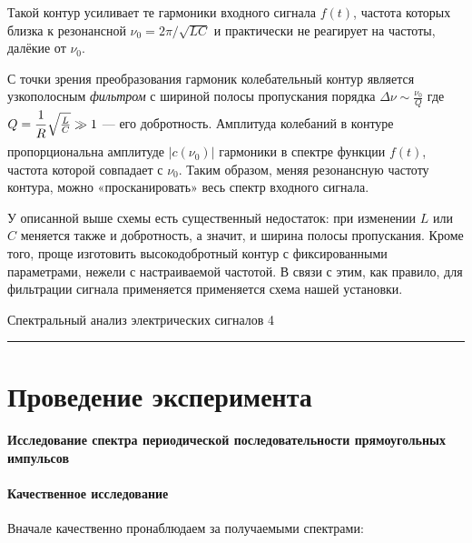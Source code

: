\documentclass[12pt,a4paper]{scrartcl}
\begin{document}
	Такой контур усиливает те гармоники входного сигнала $f(t)$, частота которых близка к резонансной $\nu_0 = 2\pi / \sqrt{LC}$ и практически не реагирует на частоты, далёкие от $\nu_0$.
	
	С точки зрения преобразования гармоник колебательный контур является узкополосным \textit{фильтром} с шириной полосы пропускания порядка $\Delta \nu \sim \frac{\nu_0}{Q}$ где $Q = \dfrac{\strut 1}{\strut R} \sqrt{\frac{L}{C}} \gg 1$ — его добротность. Амплитуда колебаний в контуре пропорциональна амплитуде $|c(\nu_0)|$ гармоники в спектре функции $f(t)$, частота которой совпадает с $\nu_0$. Таким образом, меняя резонансную частоту контура, можно «просканировать» весь спектр входного сигнала.
	
	У описанной выше схемы есть существенный недостаток: при изменении $L$ или $C$ меняется также и добротность, а значит, и ширина полосы пропускания. Кроме того, проще изготовить высокодобротный контур с фиксированными параметрами, нежели с настраиваемой частотой. В связи с этим, как правило, для фильтрации сигнала применяется применяется схема нашей установки.
	
	\newpage
	
	
	\begin{flushleft}
		\footnotesize{Спектральный анализ электрических сигналов} \hspace{\fill} \footnotesize{4}
		\\[-0.3cm]\noindent\rule{\textwidth}{0.3pt}
	\end{flushleft}
	
	\section{Проведение эксперимента}
	
	\paragraph{Исследование спектра периодической последовательности прямоугольных импульсов} \hfill
	
	\paragraph{Качественное исследование} \hfill
	
	Вначале качественно пронаблюдаем за получаемыми спектрами:
	
\end{document}

